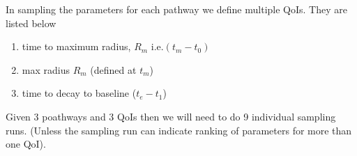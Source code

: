 \documentclass{article}
\newcommand{\commJoey}[1]{{\color{red}{\em Joey: #1}}}
\begin{document}
{\begin{figure}[h!]
\label{fig:inputoutput}
\end{figure}
In sampling the parameters for each pathway we define multiple  QoIs. They are listed below
\begin{enumerate}
\item time to maximum radius, $R_m$ i.e.$ (t_m-t_0)$
\item max radius $R_m$ (defined at $t_m$)
\item time to decay to baseline ($t_e-t_1$)
\end{enumerate} 
Given 3 poathways and 3 QoIs then we will need to do 9 individual sampling runs. (Unless the sampling run can indicate ranking of parameters for more than one QoI). 

}

  



\end{document}

